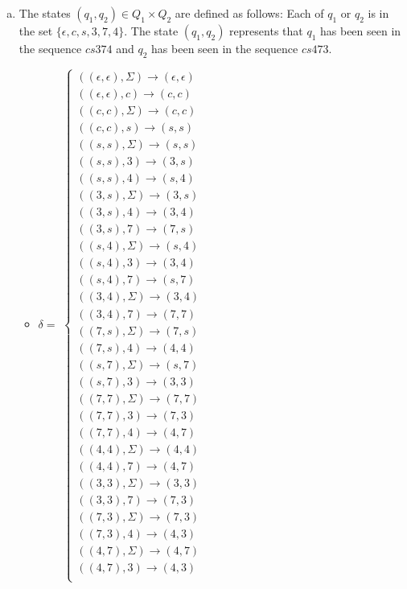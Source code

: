 \documentclass[11pt]{article}
\begin{document}
\begin{solution}
\begin{enumerate}[(a)]
\item The states $(q_1, q_2)\in Q_1\times Q_2$ are defined as follows: Each of $q_1$ or $q_2$ is in the set $\{ \epsilon,c,s,3,7,4 \}$. The state $(q_1, q_2)$ represents that $q_1$ has been seen in the sequence $cs374$ and $q_2$ has been seen in the sequence $cs473$.
\begin{itemize}
\item $\delta=$
\begin{math}
  \left\{
    \begin{array}{ll}
		((\epsilon, \epsilon), \Sigma)\to (\epsilon, \epsilon)\\
		((\epsilon, \epsilon), c)\to (c, c)\\
		((c, c), \Sigma)\to (c, c)\\
		((c, c), s)\to (s, s)\\
		((s, s), \Sigma)\to (s, s)\\
		((s, s), 3)\to (3, s)\\
		((s, s), 4)\to (s, 4)\\
		((3, s), \Sigma)\to (3, s)\\
		((3, s), 4)\to (3, 4)\\
		((3, s), 7)\to (7, s)\\
		((s, 4), \Sigma)\to (s, 4)\\
		((s, 4), 3)\to (3, 4)\\
		((s, 4), 7)\to (s, 7)\\
		((3, 4), \Sigma)\to (3, 4)\\
		((3, 4), 7)\to (7, 7)\\
		((7, s), \Sigma)\to (7, s)\\
		((7, s), 4)\to (4, 4)\\
		((s, 7), \Sigma)\to (s, 7)\\
		((s, 7), 3)\to (3, 3)\\
		((7, 7), \Sigma)\to (7, 7)\\
		((7, 7), 3)\to (7, 3)\\
		((7, 7), 4)\to (4, 7)\\
		((4, 4), \Sigma)\to (4, 4)\\
		((4, 4), 7)\to (4, 7)\\
		((3, 3), \Sigma)\to (3, 3)\\
		((3, 3), 7)\to (7, 3)\\
		((7, 3), \Sigma)\to (7, 3)\\
		((7, 3), 4)\to (4, 3)\\
		((4, 7), \Sigma)\to (4, 7)\\
		((4, 7), 3)\to (4, 3)\\

\end{array}
\end{math}
\end{itemize}
\end{enumerate}
\end{solution}
\end{document}
